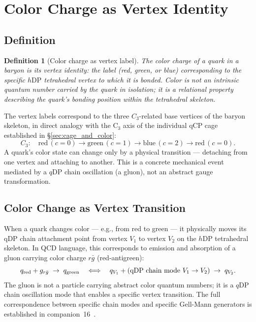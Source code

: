 \documentclass[12pt]{article}
\newtheorem{definition}[theorem]{Definition}
\newcommand{\qDP}{q\mathrm{DP}}
\newcommand{\hDP}{h\mathrm{DP}}
\begin{document}
\section{Color Charge as Vertex Identity}
\label{sec:color_identity}

\subsection{Definition}

\begin{definition}[Color charge as vertex label]
\label{def:color}
The color charge of a quark in a baryon is its vertex identity:
the label (red, green, or blue) corresponding to the specific
$\hDP$ tetrahedral vertex to which it is bonded.  Color is not an
intrinsic quantum number carried by the quark in isolation; it is
a \emph{relational property} describing the quark's bonding position
within the tetrahedral skeleton.
\end{definition}

The vertex labels correspond to the three $C_3$-related base vertices
of the baryon skeleton, in direct analogy with the C$_3$ axis of the
individual qCP cage established in §\ref{sec:cage_and_color}:
\begin{equation}
C_3: \quad \text{red}\,(c=0) \to \text{green}\,(c=1) \to
\text{blue}\,(c=2) \to \text{red}\,(c=0).
\label{eq:color_cycle}
\end{equation}
A quark's color state can change only by a physical transition ---
detaching from one vertex and attaching to another.  This is a
concrete mechanical event mediated by a $\qDP$ chain oscillation
(a gluon), not an abstract gauge transformation.

\subsection{Color Change as Vertex Transition}

When a quark changes color --- e.g., from red to green --- it
physically moves its qDP chain attachment point from vertex $V_1$
to vertex $V_2$ on the $\hDP$ tetrahedral skeleton.  In QCD language,
this corresponds to emission and absorption of a gluon carrying
color charge $r\bar{g}$ (red-antigreen):
\begin{equation}
q_{\rm red} + g_{r\bar{g}} \;\to\; q_{\rm green}
\quad\Longleftrightarrow\quad
q_{V_1} + \text{(qDP chain mode } V_1 \to V_2\text{)}
\;\to\; q_{V_2}.
\label{eq:color_change}
\end{equation}
The gluon is not a particle carrying abstract color quantum numbers;
it is a $\qDP$ chain oscillation mode that enables a specific vertex
transition.  The full correspondence between specific chain modes
and specific Gell-Mann generators is established in
companion~16~\cite{c16}.
\end{document}
